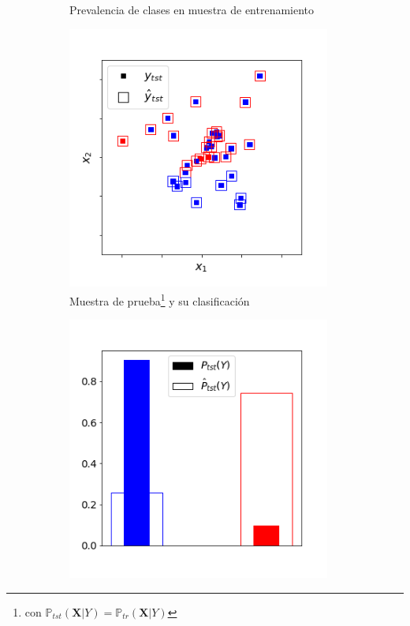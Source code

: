\begin{figure}[H]
\begin{subfigure}[t]{0.36\textwidth}
        \caption{Prevalencia de clases en muestra de
        entrenamiento}\label{cambios:prevalencia_tr}
    \end{subfigure}
    \medskip
    \begin{subfigure}[t]{0.36\textwidth}
        \centering
        \includegraphics[width=0.95\textwidth]{../plots_teoria/cambios_test_scatterplot.png}
        \caption{Muestra de prueba\footnote{con
        $\mathbb{P}_{tst}(\boldsymbol{X}|Y) =
        \mathbb{P}_{tr}(\boldsymbol{X}|Y)$} y su
        clasificación}\label{cambios:clasificacion_tst}
    \end{subfigure}
    \hfill
    \begin{subfigure}[t]{0.36\textwidth}
        \centering
        \includegraphics[width=0.95\textwidth]{../plots_teoria/cambios_test_barplot.png}

\end{subfigure}
\end{figure}
